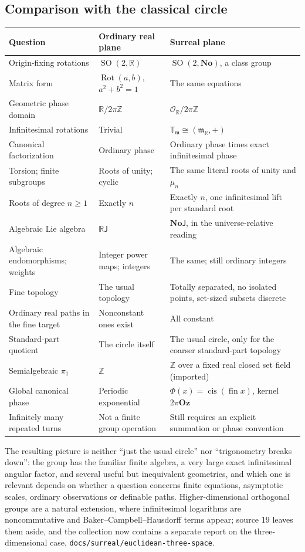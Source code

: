 \documentclass[11pt,letterpaper]{article}
\numberwithin{equation}{section}
\theoremstyle{definition}
\theoremstyle{remark}
\newcommand{\No}{\mathbf{No}}
\newcommand{\Oz}{\mathbf{Oz}}
\newcommand{\R}{\mathbb R}
\newcommand{\Z}{\mathbb Z}
\newcommand{\OO}{\mathcal O}
\newcommand{\mm}{\mathfrak m}
\newcommand{\TT}{\mathbb T}
\newcommand{\fin}{\operatorname{fin}}
\newcommand{\cis}{\operatorname{cis}}
\newcommand{\SO}{\operatorname{SO}}
\newcommand{\Rot}{\operatorname{Rot}}
\newcommand{\Tm}{\TT_{\mm}}
\begin{document}
\subsection{Comparison with the classical circle}\label{trigonometry:rot:sec:comparison}
\begin{center}\small
\begin{longtable}{L{0.25\textwidth}L{0.27\textwidth}L{0.38\textwidth}}
\toprule
Question & Ordinary real plane & Surreal plane\\
\midrule\endhead
Origin-fixing rotations & $\SO(2,\R)$ & $\SO(2,\No)$, a class group\\
Matrix form & $\Rot(a,b)$, $a^2+b^2=1$ & The same equations\\
Geometric phase domain & $\R/2\pi\Z$ & $\OO_{\R}/2\pi\Z$\\
Infinitesimal rotations & Trivial & $\Tm\cong(\mm_{\R},+)$\\
Canonical factorization & Ordinary phase & Ordinary phase times exact infinitesimal phase\\
Torsion; finite subgroups & Roots of unity; cyclic & The same literal roots of unity and $\mu_n$\\
Roots of degree $n\ge1$ & Exactly $n$ & Exactly $n$, one infinitesimal lift per standard root\\
Algebraic Lie algebra & $\R\mathsf J$ & $\No\mathsf J$, in the universe-relative reading\\
Algebraic endomorphisms; weights & Integer power maps; integers & The same; still ordinary integers\\
Fine topology & The usual topology & Totally separated, no isolated points, set-sized subsets discrete\\
Ordinary real paths in the fine target & Nonconstant ones exist & All constant\\
Standard-part quotient & The circle itself & The usual circle, only for the coarser standard-part topology\\
Semialgebraic $\pi_1$ & $\Z$ & $\Z$ over a fixed real closed set field (imported)\\
Global canonical phase & Periodic exponential & $\Phi(x)=\cis(\fin x)$, kernel $2\pi\Oz$\\
Infinitely many repeated turns & Not a finite group operation & Still requires an explicit summation or phase convention\\
\bottomrule
\end{longtable}
\end{center}
The resulting picture is neither ``just the usual circle'' nor ``trigonometry breaks down'': the
group has the familiar finite algebra, a very large exact infinitesimal angular factor, and several
useful but inequivalent geometries, and which one is relevant depends on whether a question concerns
finite equations, asymptotic scales, ordinary observations or definable paths. Higher-dimensional
orthogonal groups are a natural extension, where infinitesimal logarithms are noncommutative and
Baker--Campbell--Hausdorff terms appear; source 19 leaves them aside, and the collection now contains
a separate report on the three-dimensional case, \texttt{docs/surreal/euclidean-three-space}.
\end{document}
